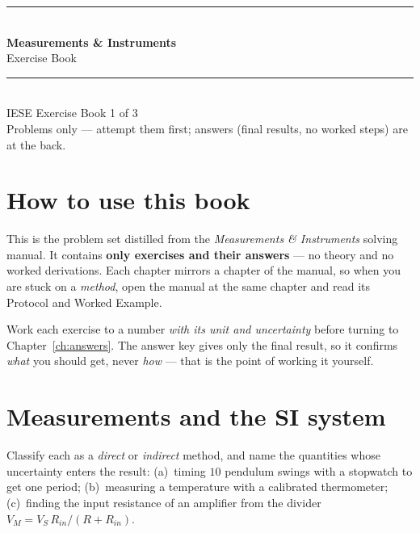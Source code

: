 \documentclass[11pt,a4paper,oneside]{book}
\begin{document}
\frontmatter

\begingroup
\thispagestyle{empty}\centering
\vspace*{2.2cm}
{\color{accent}\rule{\linewidth}{1.4pt}}\\[0.5cm]
{\Huge\bfseries\color{accent} Measurements \& Instruments}\\[0.35cm]
{\LARGE Exercise Book}\\[0.4cm]
{\color{accent}\rule{\linewidth}{1.4pt}}\\[1.2cm]
{\large IESE Exercise Book 1 of 3}\\[1.6cm]
{\footnotesize Problems only --- attempt them first; answers (final results, no
worked steps) are at the back.}
\par\vspace*{\fill}
\endgroup
\clearpage

\chapter*{How to use this book}

This is the problem set distilled from the \emph{Measurements \& Instruments}
solving manual. It contains \textbf{only exercises and their answers} --- no
theory and no worked derivations. Each chapter mirrors a chapter of the manual,
so when you are stuck on a \emph{method}, open the manual at the same chapter and
read its Protocol and Worked Example.

\begin{keyidea}
Work each exercise to a number \emph{with its unit and uncertainty} before
turning to Chapter~\ref{ch:answers}. The answer key gives only the final
result, so it confirms \emph{what} you should get, never \emph{how} --- that is
the point of working it yourself.
\end{keyidea}

\tableofcontents
\clearpage
\mainmatter

\chapter{Measurements and the SI system}

\begin{exercise}
Classify each as a \emph{direct} or \emph{indirect} method, and name the
quantities whose uncertainty enters the result:
(a)~timing $10$ pendulum swings with a stopwatch to get one period;
(b)~measuring a temperature with a calibrated thermometer;
(c)~finding the input resistance of an amplifier from the divider
$V_M=V_S\,R_{in}/(R+R_{in})$.
\end{exercise}
\end{document}
